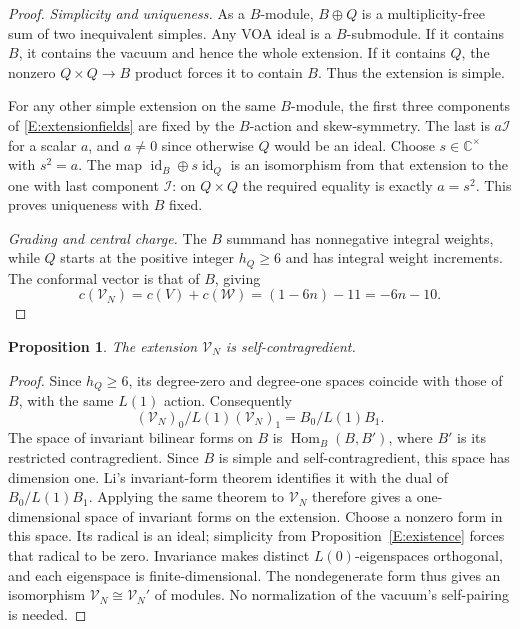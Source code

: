 \documentclass[11pt]{article}
\newtheorem{proposition}[theorem]{Proposition}
\newcommand{\C}{\mathbb C}\newcommand{\Q}{\mathbb Q}\newcommand{\Z}{\mathbb Z}
\newcommand{\Hom}{\operatorname{Hom}}\newcommand{\id}{\operatorname{id}}
\numberwithin{equation}{section}
\begin{document}
\begin{proof}
\emph{Simplicity and uniqueness.} As a $B$-module, $B\oplus Q$ is a multiplicity-free sum of two inequivalent simples. Any VOA ideal is a $B$-submodule. If it contains $B$, it contains the vacuum and hence the whole extension. If it contains $Q$, the nonzero $Q\times Q\to B$ product forces it to contain $B$. Thus the extension is simple.

For any other simple extension on the same $B$-module, the first three components of \eqref{E:extensionfields} are fixed by the $B$-action and skew-symmetry. The last is $a\mathcal I$ for a scalar $a$, and $a\neq0$ since otherwise $Q$ would be an ideal. Choose $s\in\C^\times$ with $s^2=a$. The map $\id_B\oplus s\id_Q$ is an isomorphism from that extension to the one with last component $\mathcal I$: on $Q\times Q$ the required equality is exactly $a=s^2$. This proves uniqueness with $B$ fixed.

\emph{Grading and central charge.} The $B$ summand has nonnegative integral weights, while $Q$ starts at the positive integer $h_Q\geq6$ and has integral weight increments. The conformal vector is that of $B$, giving
\[
c(\mathscr{V}_N)=c(V)+c(\mathcal W)=(1-6n)-11=-6n-10.
\]
\end{proof}

\begin{proposition}\label{E:selfdual}
The extension $\mathscr{V}_N$ is self-contragredient.
\end{proposition}
\begin{proof}
Since $h_Q\geq6$, its degree-zero and degree-one spaces coincide with those of $B$, with the same $L(1)$ action. Consequently
\[
(\mathscr{V}_N)_0/L(1)(\mathscr{V}_N)_1=B_0/L(1)B_1.
\]
The space of invariant bilinear forms on $B$ is $\Hom_B(B,B')$, where $B'$ is its restricted contragredient. Since $B$ is simple and self-contragredient, this space has dimension one. Li's invariant-form theorem \cite{A:Li} identifies it with the dual of $B_0/L(1)B_1$. Applying the same theorem to $\mathscr{V}_N$ therefore gives a one-dimensional space of invariant forms on the extension. Choose a nonzero form in this space. Its radical is an ideal; simplicity from Proposition~\ref{E:existence} forces that radical to be zero. Invariance makes distinct $L(0)$-eigenspaces orthogonal, and each eigenspace is finite-dimensional. The nondegenerate form thus gives an isomorphism $\mathscr{V}_N\cong\mathscr{V}_N'$ of modules. No normalization of the vacuum's self-pairing is needed.
\end{proof}
\end{document}
